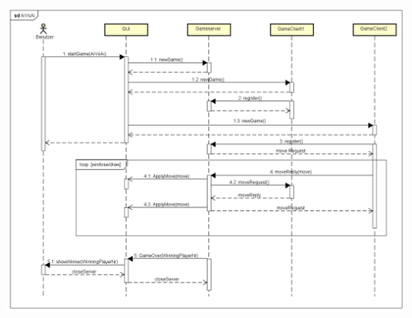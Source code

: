 \documentclass[12pt,a4paper,bibliography=totocnumbered,listof=totocnumbered]{article}
\begin{document}
\begin{appendix}
\vspace{1em}
\begin{minipage}{\linewidth}
	\centering
	\includegraphics[width=1.0\linewidth]{pics/SequenceDiagramAiVsAi.png}
    \label{fig:AiVsAi}
\end{minipage}

\pagebreak


\end{appendix}
\end{document}
